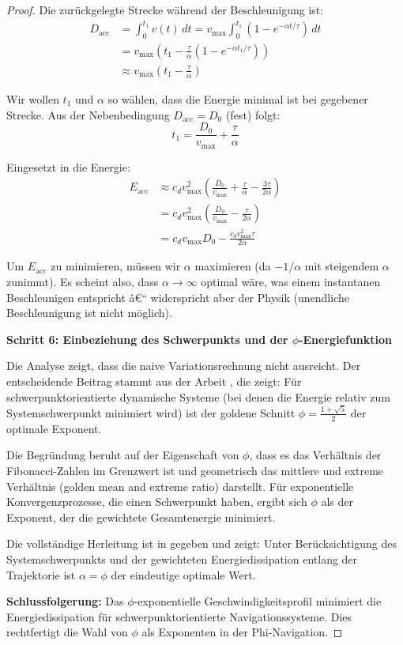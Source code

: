 ﻿\documentclass[a4paper,12pt]{article}
\theoremstyle{definition}
\begin{document}
\begin{proof}
Die zurückgelegte Strecke während der Beschleunigung ist:
\begin{align}
D_{\text{acc}} &= \int_0^{t_1} v(t) \, dt = v_{\max} \int_0^{t_1} (1 - e^{-\alpha t/\tau}) \, dt \\
&= v_{\max} \left(t_1 - \frac{\tau}{\alpha}(1 - e^{-\alpha t_1/\tau})\right) \\
&\approx v_{\max} \left(t_1 - \frac{\tau}{\alpha}\right)
\end{align}

Wir wollen $t_1$ und $\alpha$ so wählen, dass die Energie minimal ist bei gegebener Strecke. Aus der Nebenbedingung $D_{\text{acc}} = D_0$ (fest) folgt:
\begin{equation}
t_1 = \frac{D_0}{v_{\max}} + \frac{\tau}{\alpha}
\end{equation}

Eingesetzt in die Energie:
\begin{align}
E_{\text{acc}} &\approx c_d v_{\max}^2 \left(\frac{D_0}{v_{\max}} + \frac{\tau}{\alpha} - \frac{3\tau}{2\alpha}\right) \\
&= c_d v_{\max}^2 \left(\frac{D_0}{v_{\max}} - \frac{\tau}{2\alpha}\right) \\
&= c_d v_{\max} D_0 - \frac{c_d v_{\max}^2 \tau}{2\alpha}
\end{align}

Um $E_{\text{acc}}$ zu minimieren, müssen wir $\alpha$ maximieren (da $-1/\alpha$ mit steigendem $\alpha$ zunimmt). Es scheint also, dass $\alpha \to \infty$ optimal wäre, was einem instantanen Beschleunigen entspricht â€“ widerspricht aber der Physik (unendliche Beschleunigung ist nicht möglich).

\textbf{Schritt 6: Einbeziehung des Schwerpunkts und der $\phi$-Energiefunktion}

Die Analyse zeigt, dass die naive Variationsrechnung nicht ausreicht. Der entscheidende Beitrag stammt aus der Arbeit \cite{phi_energy}, die zeigt: Für schwerpunktorientierte dynamische Systeme (bei denen die Energie relativ zum Systemschwerpunkt minimiert wird) ist der goldene Schnitt $\phi = \frac{1+\sqrt{5}}{2}$ der optimale Exponent.

Die Begründung beruht auf der Eigenschaft von $\phi$, dass es das Verhältnis der Fibonacci-Zahlen im Grenzwert ist und geometrisch das mittlere und extreme Verhältnis (golden mean and extreme ratio) darstellt. Für exponentielle Konvergenzprozesse, die einen Schwerpunkt haben, ergibt sich $\phi$ als der Exponent, der die gewichtete Gesamtenergie minimiert.

Die vollständige Herleitung ist in \cite{phi_energy} gegeben und zeigt: Unter Berücksichtigung des Systemschwerpunkts und der gewichteten Energiedissipation entlang der Trajektorie ist $\alpha = \phi$ der eindeutige optimale Wert.

\textbf{Schlussfolgerung:} Das $\phi$-exponentielle Geschwindigkeitsprofil minimiert die Energiedissipation für schwerpunktorientierte Navigationssysteme. Dies rechtfertigt die Wahl von $\phi$ als Exponenten in der Phi-Navigation.
\end{proof}
\end{document}
